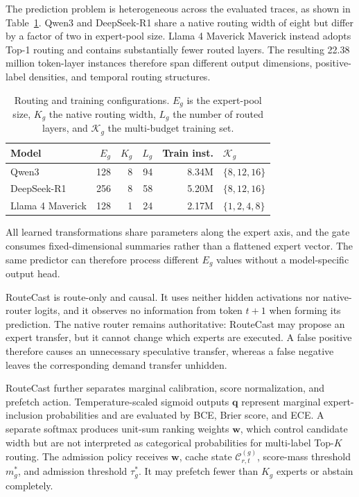 \documentclass[conference]{IEEEtran}
\begin{document}
The prediction problem is heterogeneous across the evaluated traces, as shown
in Table~\ref{tab:route-regimes}. Qwen3 and DeepSeek-R1 share a native routing
width of eight but differ by a factor of two in expert-pool size. Llama 4 Maverick
Maverick instead adopts Top-1 routing and contains substantially fewer routed
layers. The resulting 22.38 million token-layer instances therefore span
different output dimensions, positive-label densities, and temporal routing
structures.

\begin{table}[!t]
\centering
\caption{Routing and training configurations. \(E_g\) is the expert-pool size,
\(K_g\) the native routing width, \(L_g\) the number of routed layers, and
\(\mathcal{K}_g\) the multi-budget training set.}
\label{tab:route-regimes}
\scriptsize
\setlength{\tabcolsep}{2.3pt}
\begin{tabular}{@{}lrrrrl@{}}
\toprule
Model & \(E_g\) & \(K_g\) & \(L_g\) & Train inst. & \(\mathcal{K}_g\) \\
\midrule
Qwen3             & 128 & 8 & 94 & 8.34M & \(\{8,12,16\}\) \\
DeepSeek-R1       & 256 & 8 & 58 & 5.20M & \(\{8,12,16\}\) \\
Llama 4 Maverick  & 128 & 1 & 24 & 2.17M & \(\{1,2,4,8\}\) \\
\bottomrule
\end{tabular}
\end{table}

All learned transformations share parameters along the expert axis, and the
gate consumes fixed-dimensional summaries rather than a flattened expert
vector. The same predictor can therefore process different \(E_g\) values
without a model-specific output head.

RouteCast is route-only and causal. It uses neither hidden activations nor
native-router logits, and it observes no information from token $t+1$ when
forming its prediction. The native router remains authoritative: RouteCast may
propose an expert transfer, but it cannot change which experts are executed. A
false positive therefore causes an unnecessary speculative transfer, whereas a
false negative leaves the corresponding demand transfer unhidden.

RouteCast further separates marginal calibration, score normalization, and
prefetch action. Temperature-scaled sigmoid outputs \(\mathbf{q}\) represent
marginal expert-inclusion probabilities and are evaluated by BCE, Brier score,
and ECE. A separate softmax produces unit-sum ranking weights \(\mathbf{w}\),
which control candidate width but are not interpreted as categorical
probabilities for multi-label Top-\(K\) routing. The admission policy receives
\(\mathbf{w}\), cache state \(\mathcal{C}_{r,t}^{(g)}\), score-mass threshold
\(m_g^*\), and admission threshold \(\tau_g^*\). It may prefetch fewer than
\(K_g\) experts or abstain completely.
\end{document}
